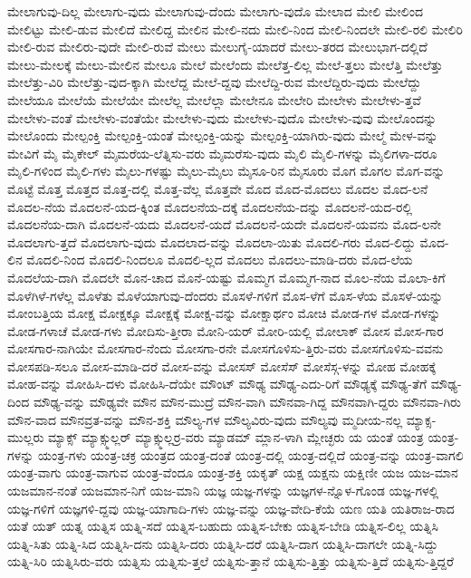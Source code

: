 {ಮೇಲಾಗುವು-ದಿಲ್ಲ
ಮೇಲಾಗು-ವುದು
ಮೇಲಾಗುವು-ದೆಂದು
ಮೇಲಾಗು-ವುದೊ
ಮೇಲಾದ
ಮೇಲಿ
ಮೇಲಿಂದ
ಮೇಲಿಟ್ಟು
ಮೇಲಿ-ಡುವ
ಮೇಲಿದೆ
ಮೇಲಿದ್ದ
ಮೇಲಿನ
ಮೇಲಿ-ನದು
ಮೇಲಿ-ನಿಂದ
ಮೇಲಿ-ನಿಂದಲೇ
ಮೇಲಿ-ರಲಿ
ಮೇಲಿರಿ
ಮೇಲಿ-ರುವ
ಮೇಲಿರು-ವುದೇ
ಮೇಲಿ-ರುವೆ
ಮೇಲು
ಮೇಲುಗೈ-ಯಾದರೆ
ಮೇಲು-ತರದ
ಮೇಲುಭಾಗ-ದಲ್ಲಿದೆ
ಮೇಲು-ಮೇಲಕ್ಕೆ
ಮೇಲು-ಮೇಲಿನ
ಮೇಲೂ
ಮೇಲೆ
ಮೇಲೆಂದು
ಮೇಲೆತ್ತ-ಲಿಲ್ಲ
ಮೇಲೆ-ತ್ತಲು
ಮೇಲೆತ್ತಿ
ಮೇಲೆತ್ತು
ಮೇಲೆತ್ತು-ವಿರಿ
ಮೇಲೆತ್ತು-ವುದ-ಕ್ಕಾಗಿ
ಮೇಲೆದ್ದ
ಮೇಲೆ-ದ್ದವು
ಮೇಲೆದ್ದಿ-ರುವ
ಮೇಲೆದ್ದಿರು-ವುದು
ಮೇಲೆದ್ದು
ಮೇಲೆಯೂ
ಮೇಲೆಯೆ
ಮೇಲೆಯೇ
ಮೇಲೆಲ್ಲ
ಮೇಲೆಲ್ಲಾ
ಮೇಲೇನೂ
ಮೇಲೇರಿ
ಮೇಲೇಳು
ಮೇಲೇಳು-ತ್ತವೆ
ಮೇಲೇಳು-ವಂತೆ
ಮೇಲೇಳು-ವಂತೆಯೇ
ಮೇಲೇಳು-ವುದು
ಮೇಲೇಳು-ವುದೊ
ಮೇಲೇಳು-ವುವು
ಮೇಲೊಂದನ್ನು
ಮೇಲೊಂದು
ಮೇಲ್ಪಂಕ್ತಿ
ಮೇಲ್ಪಂಕ್ತಿ-ಯಂತೆ
ಮೇಲ್ಪಂಕ್ತಿ-ಯನ್ನು
ಮೇಲ್ಪಂಕ್ತಿ-ಯಾಗಿರು-ವುದು
ಮೇಲ್ಮೆ
ಮೇಳ-ವನ್ನು
ಮೇವಿಗೆ
ಮೈ
ಮೈಕೇಲ್
ಮೈಮರೆಯ-ಲೆತ್ನಿಸು-ವರು
ಮೈಮರೆಸು-ವುದು
ಮೈಲಿ
ಮೈಲಿ-ಗಳನ್ನು
ಮೈಲಿಗಳಾ-ದರೂ
ಮೈಲಿ-ಗಳಿಂದ
ಮೈಲಿ-ಗಳು
ಮೈಲು-ಗಳಷ್ಟು
ಮೈಲು-ಮೈಲು
ಮೈಸೂ-ರಿನ
ಮೈಸೂರು
ಮೊಗ
ಮೊಗಲ
ಮೊಗ-ವನ್ನು
ಮೊಟ್ಟೆ
ಮೊತ್ತ
ಮೊತ್ತದ
ಮೊತ್ತ-ದಲ್ಲಿ
ಮೊತ್ತ-ವೆಲ್ಲ
ಮೊತ್ತವೇ
ಮೊದ
ಮೊದ-ಮೊದಲು
ಮೊದಲ
ಮೊದ-ಲನೆ
ಮೊದಲ-ನೆಯ
ಮೊದಲನೆ-ಯದ-ಕ್ಕಿಂತ
ಮೊದಲನೆಯ-ದಕ್ಕೆ
ಮೊದಲನೆಯ-ದನ್ನು
ಮೊದಲನೆ-ಯದ-ರಲ್ಲಿ
ಮೊದಲನೆಯ-ದಾಗಿ
ಮೊದಲನೆ-ಯದು
ಮೊದಲನೆ-ಯದೆ
ಮೊದಲನೆ-ಯದೇ
ಮೊದಲನೆ-ಯವನು
ಮೊದ-ಲನೇ
ಮೊದಲಾಗು-ತ್ತದೆ
ಮೊದಲಾಗು-ವುದು
ಮೊದಲಾದ-ವನ್ನು
ಮೊದಲಾ-ಯಿತು
ಮೊದಲಿ-ಗರು
ಮೊದ-ಲಿದ್ದು
ಮೊದ-ಲಿನ
ಮೊದಲಿ-ನಿಂದ
ಮೊದಲಿ-ನಿಂದಲೂ
ಮೊದಲಿ-ಲ್ಲದ
ಮೊದಲು
ಮೊದಲು-ಮಾಡಿ-ದರು
ಮೊದ-ಲೆಯ
ಮೊದಲೆಯ-ದಾಗಿ
ಮೊದಲೇ
ಮೊನ-ಚಾದ
ಮೊನೆ-ಯಷ್ಟು
ಮೊಮ್ಮಗ
ಮೊಮ್ಮಗ-ನಾದ
ಮೊಲ-ನೆಯ
ಮೊಲಾ-ಕಿಗೆ
ಮೊಳೆಗಿಳೆ-ಗಳೆಲ್ಲ
ಮೊಳೆತು
ಮೊಳೆಯಾಗುವು-ದೆಂದರು
ಮೊಸಳೆ-ಗಳಿಗೆ
ಮೊಸ-ಳೆಗೆ
ಮೊಸ-ಳೆಯ
ಮೊಸಳೆ-ಯನ್ನು
ಮೋಂಬತ್ತಿಯ
ಮೋಕ್ಷ
ಮೋಕ್ಷಕ್ಕೂ
ಮೋಕ್ಷಕ್ಕೆ
ಮೋಕ್ಷ-ವನ್ನು
ಮೋಕ್ಷಾರ್ಥಂ
ಮೋಚಿ
ಮೋಡ-ಗಳ
ಮೋಡ-ಗಳನ್ನು
ಮೋಡ-ಗಳಾಚೆ
ಮೋಡ-ಗಳು
ಮೋದಿಸು-ತ್ತೀರಾ
ಮೋನಿ-ಯರ್
ಮೋರಿ-ಯಲ್ಲಿ
ಮೋಲಾಕ್
ಮೋಸ
ಮೋಸ-ಗಾರ
ಮೋಸಗಾರ-ನಾಗಿಯೇ
ಮೋಸಗಾರ-ನೆಂದು
ಮೋಸಗಾ-ರನೇ
ಮೋಸಗೊಳಿಸು-ತ್ತಿರು-ವರು
ಮೋಸಗೊಳಿಸು-ವವನು
ಮೋಸಪಡಿ-ಸಲೂ
ಮೋಸ-ಮಾಡಿ-ದರೆ
ಮೋಸ-ವನ್ನು
ಮೋಸಸ್
ಮೋಸೆಸ್
ಮೋಸೆಸ್ಗ-ಳನ್ನು
ಮೋಹ
ಮೋಹಕ್ಕೆ
ಮೋಹ-ವನ್ನು
ಮೋಹಿಸಿ-ದಳು
ಮೋಹಿಸಿ-ದೆಯೇ
ಮೌಂಟ್
ಮೌಢ್ಯ
ಮೌಢ್ಯ-ಎದು-ರಿಗೆ
ಮೌಢ್ಯಕ್ಕೆ
ಮೌಢ್ಯ-ತೆಗೆ
ಮೌಢ್ಯ-ದಿಂದ
ಮೌಢ್ಯ-ವನ್ನು
ಮೌಢ್ಯವೇ
ಮೌನ
ಮೌನ-ಮುದ್ರೆ
ಮೌನ-ವಾಗಿ
ಮೌನವಾ-ಗಿದ್ದ
ಮೌನವಾಗಿ-ದ್ದರು
ಮೌನವಾ-ಗಿರು
ಮೌನ-ವಾದ
ಮೌನವ್ರತ-ವನ್ನು
ಮೌನ-ಶಕ್ತಿ
ಮೌಲ್ಯ-ಗಳ
ಮೌಲ್ಯವಿರು-ವುದು
ಮೌಲ್ಯವು
ಮ್ಮದೀಯ-ನಲ್ಲ
ಮ್ಯಾಕ್ಸ-ಮುಲ್ಲರು
ಮ್ಯಾಕ್ಸ್
ಮ್ಯಾಕ್ಸ್ಮುಲ್ಲರ್
ಮ್ಯಾಕ್ಸ್ಮುಲ್ಲರ್ರ-ವರು
ಮ್ಯಾಡಮ್
ಮ್ಲಾನ-ಳಾಗಿ
ಮ್ಲೇಚ್ಛರು
ಯ
ಯಂತೆ
ಯಂತ್ರ
ಯಂತ್ರ-ಗಳನ್ನು
ಯಂತ್ರ-ಗಳು
ಯಂತ್ರ-ಚಕ್ರ
ಯಂತ್ರದ
ಯಂತ್ರ-ದಂತೆ
ಯಂತ್ರ-ದಲ್ಲಿ
ಯಂತ್ರ-ದಲ್ಲಿದೆ
ಯಂತ್ರ-ವನ್ನು
ಯಂತ್ರ-ವಾಗಲಿ
ಯಂತ್ರ-ವಾಗು
ಯಂತ್ರ-ವಾಗುವ
ಯಂತ್ರ-ವೆಂದೂ
ಯಂತ್ರ-ಶಕ್ತಿ
ಯಕೃತ್
ಯಕ್ಷ
ಯಕ್ಷನು
ಯಕ್ಷಿಣೀ
ಯಜ
ಯಜ-ಮಾನ
ಯಜಮಾನ-ನಂತೆ
ಯಜಮಾನ-ನಿಗೆ
ಯಜ-ಮಾನಿ
ಯಜ್ಞ
ಯಜ್ಞ-ಗಳನ್ನು
ಯಜ್ಞಗಳ-ನ್ನೊಳ-ಗೊಂಡ
ಯಜ್ಞ-ಗಳಲ್ಲಿ
ಯಜ್ಞ-ಗಳಿಗೆ
ಯಜ್ಞಗಳಿ-ದ್ದವು
ಯಜ್ಞ-ಯಾಗಾದಿ-ಗಳು
ಯಜ್ಞ-ವನ್ನು
ಯಜ್ಞ-ವೇದಿ-ಕೆಯೆ
ಯಣ
ಯತಿ
ಯತಿರಾಜ-ರಾದ
ಯತೆ
ಯತ್
ಯತ್ನ
ಯತ್ನಿಸ
ಯತ್ನಿ-ಸದೆ
ಯತ್ನಿಸ-ಬಹುದು
ಯತ್ನಿಸ-ಬೇಕು
ಯತ್ನಿಸ-ಬೇಡಿ
ಯತ್ನಿಸ-ಲಿಲ್ಲ
ಯತ್ನಿಸಿ
ಯತ್ನಿ-ಸಿತು
ಯತ್ನಿ-ಸಿದ
ಯತ್ನಿಸಿ-ದನು
ಯತ್ನಿಸಿ-ದರು
ಯತ್ನಿಸಿ-ದರೆ
ಯತ್ನಿಸಿ-ದಾಗ
ಯತ್ನಿಸಿ-ದಾಗಲೇ
ಯತ್ನಿ-ಸಿದ್ದು
ಯತ್ನಿ-ಸಿರಿ
ಯತ್ನಿಸಿರು-ವರು
ಯತ್ನಿಸು
ಯತ್ನಿಸು-ತ್ತಲೆ
ಯತ್ನಿಸು-ತ್ತಾನೆ
ಯತ್ನಿಸು-ತ್ತಿತ್ತು
ಯತ್ನಿಸು-ತ್ತಿದೆ
ಯತ್ನಿಸು-ತ್ತಿದ್ದರೆ
}
